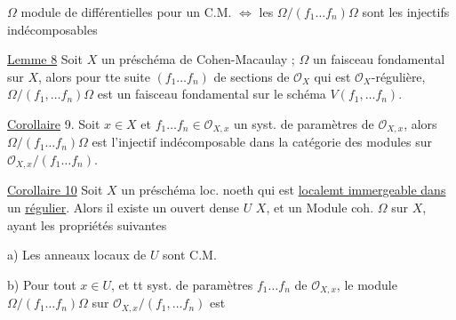 $\Omega$ module de différentielles pour un C.M. $\Longleftrightarrow$ les $\Omega/(f_1\ldots f_n)\Omega$ sont les injectifs indécomposables

 

\uline{Lemme 8} Soit $X$ un préschéma de Cohen-Macaulay ;  $\Omega$ un faisceau fondamental sur $X$, alors pour tte suite $(f_1\ldots f_n)$ de sections de $\mathcal O_X$ qui est $\mathcal O_X$-régulière, $\Omega/(f_1,\ldots f_n)\Omega$ est un faisceau fondamental sur le schéma    $V(f_1,\ldots f_n)$.

\uline{Corollaire} 9. Soit $x\in X$ et $f_1\ldots f_n\in\mathcal O_{X,x}$ un syst. de paramètres de $\mathcal O_{X,x}$, alors  $\Omega/(f_1\ldots f_n)\Omega$ est  l'injectif indécomposable dans la catégorie des modules sur $\mathcal O_{X,x}/(f_1\ldots f_n)$.

\uline{Corollaire 10} Soit $X$ un préschéma loc. noeth  qui est \uline{localemt immergeable dans} un \uline{régulier}.
Alors il existe un ouvert dense $U$  $X$, et un Module coh. $\Omega$ sur $X$, ayant les propriétés suivantes

a) Les anneaux locaux de $U$ sont C.M.

b) Pour tout $x\in U$, et tt syst. de paramètres $f_1\ldots f_n$ de $\mathcal O_{X,x}$, le module $\Omega/(f_1\ldots f_n)\Omega$ sur $\mathcal O_{X,x}/(f_1,\ldots f_n)$ est

